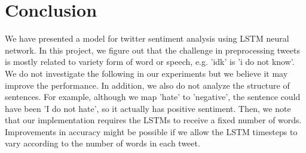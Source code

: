 \documentclass[10pt,conference,compsocconf]{IEEEtran}
\begin{document}
\section{Conclusion}
We have presented a model for twitter sentiment analysis using LSTM neural network. In this project, we figure out that the challenge in preprocessing tweets is mostly related to variety form of word or speech, e.g. 'idk' is 'i do not know'. We do not investigate the following in our experiments but we believe it may improve the performance. In addition, we also do not analyze the structure of sentences. For example, although we map 'hate' to 'negative', the sentence could have been 'I do not hate', so it actually has positive sentiment. Then, we note that our implementation requires the LSTMs to receive a fixed number of words. Improvements in accuracy might be possible if we allow the LSTM timesteps to vary according to the number of words in each tweet.



\end{document}
